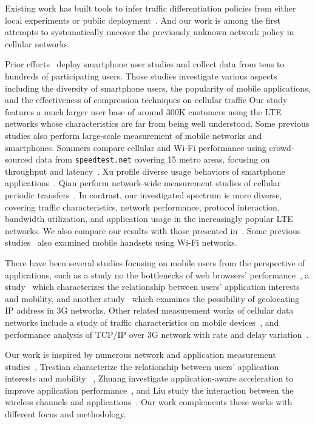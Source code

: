 Existing work has built tools to infer traffic differentiation policies from either local experiments or public deployment~\cite{imc.netpolice, nsdi.glasnost, windrider}. And our work is among the first attempts to systematically uncover the previously unknown network policy in cellular networks.

Prior efforts~\cite{falaki10_mobisys, shepard10, qian13_pam} deploy smartphone user studies and collect data from tens to hundreds of participating users. Those studies investigate various aspects including the diversity of smartphone users, the popularity of mobile applications, and the effectiveness of compression techniques on cellular traffic \etc Our study features a much larger user base of around 300K customers using the LTE networks whose characteristics are far from being well understood. Some previous studies also perform large-scale measurement of mobile networks and smartphones. Sommers \etal compare cellular and Wi-Fi performance using crowd-sourced data from \texttt{speedtest.net} covering 15 metro areas, focusing on throughput and latency~\cite{sommers12}. Xu \etal profile diverse usage behaviors of smartphone applications~\cite{xu11_imc}. Qian \etal perform network-wide measurement studies of cellular periodic transfers~\cite{qian12_www}. In contrast, our investigated spectrum is more diverse, covering traffic characteristics, network performance, protocol interaction, bandwidth utilization, and application usage in the increasingly popular LTE networks. We also compare our results with those presented in~\cite{sommers12}. Some previous studies~\cite{gember11, chen12} also examined mobile handsets using Wi-Fi networks.



There have been several studies focusing on mobile users from the perspective of applications, such as a study no the bottlenecks of web browsers' performance~\cite{hotmobile.web}, a study~\cite{Ionut:Serendipity:IMC09} which characterizes the relationship between users' application interests and mobility, and another study~\cite{Mahesh:Ephemera:IMC09} which examines the possibility of geolocating IP address in 3G networks. Other related measurement works of cellular data networks include a study of traffic characteristics on mobile devices~\cite{Maier:Traffic:PAM2010}, and performance analysis of TCP/IP over 3G network with rate and delay variation~\cite{Mun:TCP/IP:Mobicom2002}.

Our work is inspired by numerous network and application measurement studies~\cite{Chakravorty:WWAN:Mobicom2004, Zhuang:A3:Mobicom2006, Ionut:Serendipity:IMC09}, \eg Trestian \etal characterize the relationship between users' application interests and mobility ~\cite{Ionut:Serendipity:IMC09}, Zhuang \etal investigate application-aware acceleration to improve application performance~\cite{Zhuang:A3:Mobicom2006}, and Liu \etal study the interaction between the wireless channels and applications~\cite{Liu:3GChannelAppl:Mobicom2008}. Our work complements these works with different focus and methodology. 

